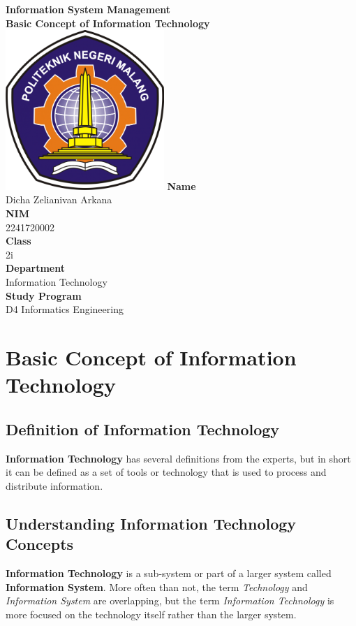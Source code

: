 \documentclass[12pt,titlepage]{article}
\newcommand{\vSubject}{Information System Management}
\newcommand{\vSubtitle}{Basic Concept of Information Technology}
\newcommand{\vName}{Dicha Zelianivan Arkana}
\newcommand{\vNIM}{2241720002}
\newcommand{\vClass}{2i}
\newcommand{\vDepartment}{Information Technology}
\newcommand{\vStudyProgram}{D4 Informatics Engineering}
\begin{document}
\begin{titlepage}
    \centering
    \vfill
    {\bfseries\LARGE
        \vSubject\\
        \vskip0.25cm
        \vSubtitle
    }
    \vfill
    \includegraphics[width=6cm]{images/polinema-logo.png}
    \vfill
    {
        \textbf{Name}\\
        \vName\\
        \vskip0.5cm
        \textbf{NIM}\\
        \vNIM\\
        \vskip0.5cm
        \textbf{Class}\\
        \vClass\\
        \vskip0.5cm
        \textbf{Department}\\
        \vDepartment\\
        \vskip0.5cm
        \textbf{Study Program}\\
        \vStudyProgram
    }
\end{titlepage}

\tableofcontents

\pagebreak

\section{Basic Concept of Information Technology}
\subsection{Definition of Information Technology}
\textbf{Information Technology} has several definitions from the experts, but in short it can
be defined as a set of tools or technology that is used to process and distribute information.

\subsection{Understanding Information Technology Concepts}
\textbf{Information Technology} is a sub-system or part of a larger system called \textbf{Information System}.
More often than not, the term \textit{Technology} and \textit{Information System} are overlapping, but
the term \textit{Information Technology} is more focused on the technology itself rather than the larger system.
\end{document}
